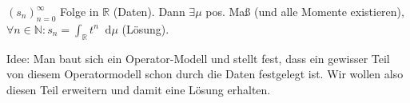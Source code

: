 \documentclass[letterpaper, 11pt]{article}
\newcommand{\R}{\mathbb{R}}
\newcommand{\N}{\mathbb{N}}
\newcommand{\1}{\mathds{1}}
\newcommand{\dd}{\mathop{}\!\mathrm{d}}
\theoremstyle{definition}
\begin{document}
\author{\normalsize Ian Hornik}
\date{\vspace{-0.8em}\normalsize\today}



$(s_n)_{n=0}^\infty$ Folge in $\R$ (Daten). Dann $\exists \mu$ pos. Maß (und alle Momente existieren), $\forall n \in \N : s_n = \int_\R t^n \dd \mu$ (Lösung).

Idee: Man baut sich ein Operator-Modell und stellt fest, dass ein gewisser Teil von diesem Operatormodell schon durch die Daten festgelegt ist. Wir wollen also diesen Teil erweitern und damit eine Lösung erhalten.
\end{document}
